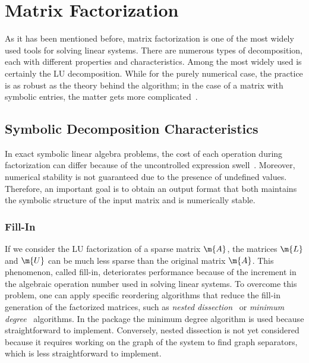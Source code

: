 
\section{Matrix Factorization}
\label{chap5:sec:last}

As it has been mentioned before, matrix factorization is one of the most widely used tools for solving linear systems. There are numerous types of decomposition, each with different properties and characteristics. Among the most widely used is certainly the LU decomposition. While for the purely numerical case, the practice is as robust as the theory behind the algorithm; in the case of a matrix with symbolic entries, the matter gets more complicated~\cite{carette2006linear,zhou2007symbolic}.

\subsection{Symbolic Decomposition Characteristics}

In exact symbolic linear algebra problems, the cost of each operation during factorization can differ because of the uncontrolled expression swell~\cite{zhou2006hierarchical}. Moreover, numerical stability is not guaranteed due to the presence of undefined values. Therefore, an important goal is to obtain an output format that both maintains the symbolic structure of the input matrix and is numerically stable.

\subsubsection{Fill-In}

If we consider the LU factorization of a sparse matrix $\m{A}$, the matrices $\m{L}$ and $\m{U}$ can be much less sparse than the original matrix $\m{A}$. This phenomenon, called fill-in, deteriorates performance because of the increment in the algebraic operation number used in solving linear systems. To overcome this problem, one can apply specific reordering algorithms that reduce the fill-in generation of the factorized matrices, such as \emph{nested dissection}~\cite{george1973nested,lipton1979generalized} or \emph{minimum degree}~\cite{markowitz1957elimination,rose1970symmetric} algorithms. In the package the minimum degree algorithm is used because straightforward to implement. Conversely, nested dissection is not yet considered because it requires working on the graph of the system to find graph separators, which is less straightforward to implement.

